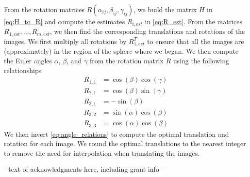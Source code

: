 \documentclass{pnastwo}
\begin{document}
\begin{article}
\begin{materials}
From the rotation matrices $R(\alpha_{ij}, \beta_{ij}, \gamma_{ij})$,
we build the matrix $H$ in \eqref{eq:H_to_R} and compute the estimates $R_{i, est}$ in \eqref{eq:R_est}.
%
From the matrices $R_{1, est}, \dots, R_{m, est}$, we then find the corresponding translations and rotations of the images.
%
We first multiply all rotations by $R_{1, est}^T$ to ensure that all the images are (approximately) in the region of the sphere where we began.
%
We then compute the Euler angles $\alpha$, $\beta$, and $\gamma$ from the rotation matrix $R$ using the following relationships
\begin{equation}
\begin{aligned}
R_{1,1} & = \cos(\beta)\cos(\gamma) \\
R_{2,1} & = \cos(\beta)\sin(\gamma) \\
R_{3,1} & = -\sin(\beta) \\
R_{3,2} & = \sin(\alpha)\cos(\beta) \\
R_{3,3} & = \cos(\alpha)\cos(\beta) 
\end{aligned}
\end{equation}
%
We then invert \eqref{eq:angle_relations} to compute the optimal translation and rotation for each image.
%
We round the optimal translations to the nearest integer to remove the need for interpolation when translating the images.  

\end{materials}




\begin{acknowledgments}
- text of acknowledgments here, including grant info -
\end{acknowledgments}






\end{article}
\end{document}
